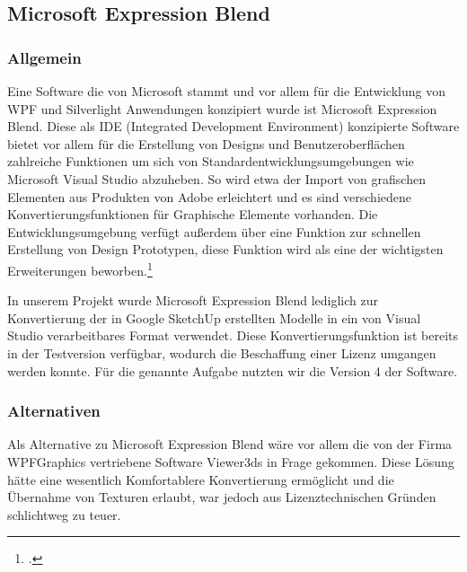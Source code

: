 \subsection{Microsoft Expression Blend}
\subsubsection{Allgemein}
Eine  Software die von Microsoft stammt und vor allem für die Entwicklung von WPF und Silverlight Anwendungen konzipiert wurde ist Microsoft Expression Blend. Diese als IDE (Integrated Development Environment) konzipierte Software bietet vor allem für die Erstellung von Designs und Benutzeroberflächen zahlreiche Funktionen um sich von Standardentwicklungsumgebungen wie Microsoft Visual Studio abzuheben. So wird etwa der Import von grafischen Elementen aus Produkten von Adobe erleichtert und es sind verschiedene Konvertierungsfunktionen für Graphische Elemente vorhanden. Die Entwicklungsumgebung verfügt außerdem über eine Funktion zur schnellen Erstellung von Design Prototypen, diese Funktion wird als eine der wichtigsten Erweiterungen beworben.\footcite[vgl.][]{expressionblend}

In unserem Projekt wurde Microsoft Expression Blend lediglich zur Konvertierung der in Google SketchUp erstellten Modelle in ein von Visual Studio verarbeitbares Format verwendet. Diese Konvertierungsfunktion ist bereits in der Testversion verfügbar, wodurch die Beschaffung einer Lizenz umgangen werden konnte. Für die genannte Aufgabe nutzten wir die Version 4 der Software. 

\subsubsection{Alternativen}
Als Alternative zu Microsoft Expression Blend wäre vor allem die von der Firma WPFGraphics vertriebene Software Viewer3ds in Frage gekommen. Diese Lösung hätte eine wesentlich Komfortablere Konvertierung ermöglicht und die Übernahme von Texturen erlaubt, war jedoch aus Lizenztechnischen Gründen schlichtweg zu teuer.
